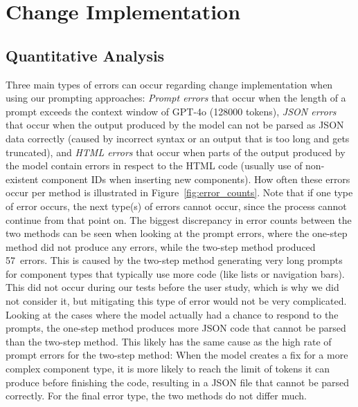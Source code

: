 \documentclass[11pt,titlepage,oneside,openany]{book}
\begin{document}
\section{Change Implementation}\label{sec:change_res}

\subsection{Quantitative Analysis}

Three main types of errors can occur regarding change implementation when using our prompting approaches: \emph{Prompt errors} that occur when the length of a prompt exceeds the context window of GPT-4o (128000 tokens), \emph{JSON errors} that occur when the output produced by the model can not be parsed as JSON data correctly (caused by incorrect syntax or an output that is too long and gets truncated), and \emph{HTML errors} that occur when parts of the output produced by the model contain errors in respect to the HTML code (usually use of non-existent component IDs when inserting new components). How often these errors occur per method is illustrated in Figure~\ref{fig:error_counts}. Note that if one type of error occurs, the next type(s) of errors cannot occur, since the process cannot continue from that point on. The biggest discrepancy in error counts between the two methods can be seen when looking at the prompt errors, where the one-step method did not produce any errors, while the two-step method produced 57~errors. This is caused by the two-step method generating very long prompts for component types that typically use more code (like lists or navigation bars). This did not occur during our tests before the user study, which is why we did not consider it, but mitigating this type of error would not be very complicated. Looking at the cases where the model actually had a chance to respond to the prompts, the one-step method produces more JSON code that cannot be parsed than the two-step method. This likely has the same cause as the high rate of prompt errors for the two-step method: When the model creates a fix for a more complex component type, it is more likely to reach the limit of tokens it can produce before finishing the code, resulting in a JSON file that cannot be parsed correctly. For the final error type, the two methods do not differ much. 
\end{document}
